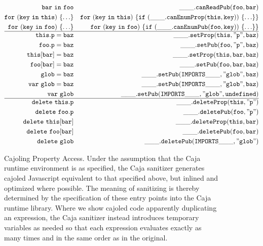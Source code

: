 \documentclass[letterpaper,twocolumn,10pt]{article}
\newcommand{\code}[1]{{\tt {#1}}}              %
\begin{document}
\begin{figure}
\begin{eqnarray}
  \code{bar\ in\ foo}       & \label{in:public}         & \code{\_\_\_.canReadPub(foo,bar)} \\
  \code{for\ (key\ in\ this)\ \{\ldots\}} & \label{for:internal}
                                 & \code{for\ (key\ in\ this)\ \{if\ (\_\_\_.canEnumProp(this,key))\ \{\ldots\}\}}\\
  \code{for\ (key\ in\ foo)\ \{\ldots\}}  & \label{for:public}
                                 & \code{for\ (key\ in\ foo)\ \{if\ (\_\_\_.canEnumPub(foo,key))\ \{\ldots\}\}} \\
  \hline
  \code{this.p = baz}       & \label{set:internal}      & \code{\_\_\_.setProp(this,"p",baz)} \\
  \code{foo.p = baz}        & \label{set:public}        & \code{\_\_\_.setPub(foo,"p",baz)} \\
  \code{this[bar] = baz}    & \label{set:index-internal} & \code{\_\_\_.setProp(this,bar,baz)} \\
  \code{foo[bar] = baz}     & \label{set:index-public}  & \code{\_\_\_.setPub(foo,bar,baz)} \\
  \code{glob = baz}         & \label{set:global}        & \code{\_\_\_.setPub(IMPORTS\_\_\_,"glob",baz)} \\
  \code{var\ glob = baz}    & \label{set:global-init}   & \code{\_\_\_.setPub(IMPORTS\_\_\_,"glob",baz)} \\
  \code{var\ glob}          & \label{set:global-decl}   & \code{\_\_\_.setPub(IMPORTS\_\_\_,"glob",undefined)}\\
  \hline
  \code{delete\ this.p}     & \label{delete-internal}   & \code{\_\_\_.deleteProp(this,"p")} \\
  \code{delete\ foo.p}      & \label{delete:public}     & \code{\_\_\_.deletePub(foo,"p")} \\
  \code{delete\ this[bar]}  & \label{delete:index-internal} & \code{\_\_\_.deleteProp(this,bar)} \\
 \code{delete\ foo[bar]}    & \label{delete:index-public}   & \code{\_\_\_.deletePub(foo,bar)} \\
  \code{delete\ glob}       & \label{delete:global}   & \code{\_\_\_.deletePub(IMPORTS\_\_\_,"glob")}
\end{eqnarray}

\caption[Cajoling Property Access]{Cajoling Property Access. Under the 
assumption that the Caja runtime environment is as specified, the Caja 
sanitizer generates cajoled Javascript equivalent to that specified above, 
but inlined and optimized where possible. The meaning of sanitizing is 
thereby determined by the specification of these entry points into the Caja 
runtime library. Where we show cajoled code apparently duplicating an 
expression, the Caja sanitizer instead introduces temporary variables as 
needed so that each expression evaluates exactly as many times and in the 
same order as in the original.}
\label{tab:prop-xlate}
\end{figure}
\end{document}
